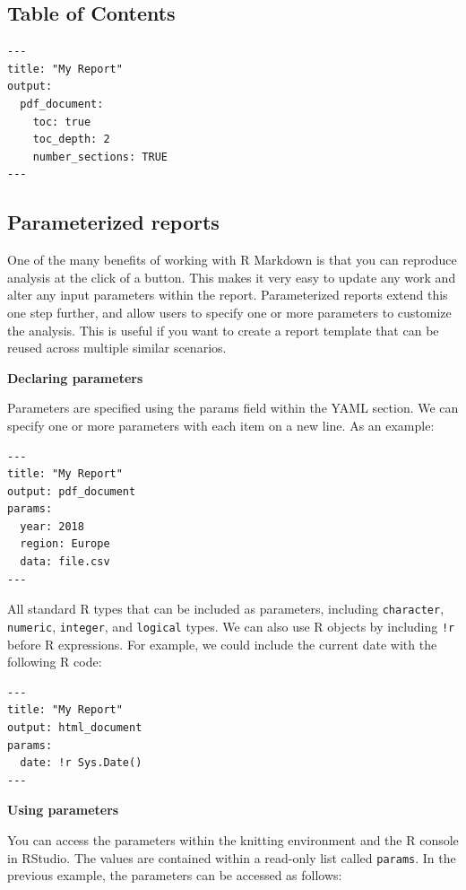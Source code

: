 \documentclass[]{book}
\theoremstyle{definition}
\theoremstyle{definition}
\theoremstyle{definition}
\theoremstyle{remark}
\begin{document}
\hypertarget{table-of-contents}{%
\subsection{Table of Contents}\label{table-of-contents}}

\begin{verbatim}
---
title: "My Report"
output:
  pdf_document:
    toc: true
    toc_depth: 2
    number_sections: TRUE
---
\end{verbatim}

\hypertarget{parameterized-reports}{%
\subsection{Parameterized reports}\label{parameterized-reports}}

One of the many benefits of working with R Markdown is that you can
reproduce analysis at the click of a button. This makes it very easy to
update any work and alter any input parameters within the report.
Parameterized reports extend this one step further, and allow users to
specify one or more parameters to customize the analysis. This is useful
if you want to create a report template that can be reused across
multiple similar scenarios.

\textbf{Declaring parameters}

Parameters are specified using the params field within the YAML section.
We can specify one or more parameters with each item on a new line. As
an example:

\begin{verbatim}
---
title: "My Report"
output: pdf_document
params:
  year: 2018
  region: Europe
  data: file.csv
---
\end{verbatim}

All standard R types that can be included as parameters, including
\texttt{character}, \texttt{numeric}, \texttt{integer}, and
\texttt{logical} types. We can also use R objects by including
\texttt{!r} before R expressions. For example, we could include the
current date with the following R code:

\begin{verbatim}
---
title: "My Report"
output: html_document
params:
  date: !r Sys.Date()
---
\end{verbatim}

\textbf{Using parameters}

You can access the parameters within the knitting environment and the R
console in RStudio. The values are contained within a read-only list
called \texttt{params}. In the previous example, the parameters can be
accessed as follows:
\end{document}
